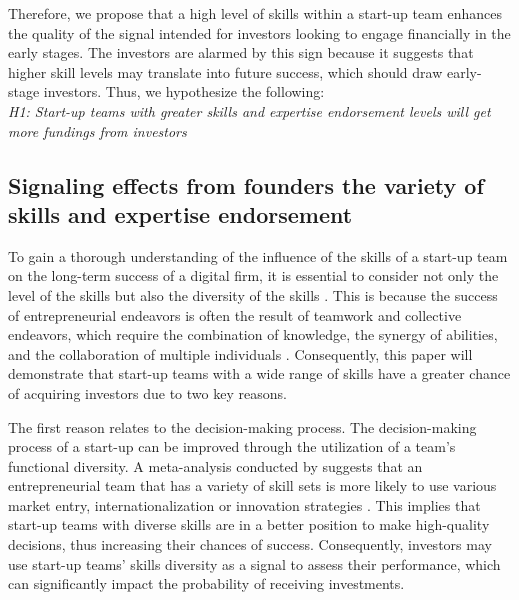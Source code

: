 \documentclass[12pt]{article}
\begin{document}
Therefore, we propose that a high level of skills within a start-up team enhances the quality of the signal intended for investors looking to engage financially in the early stages. The investors are alarmed by this sign because it suggests that higher skill levels may translate into future success, which should draw early-stage investors. Thus, we hypothesize the following: \\

\noindent \textit{H1: Start-up teams with greater skills and expertise endorsement levels will get more fundings from investors} \\

\subsection{Signaling effects from founders the variety of skills and expertise endorsement}

To gain a thorough understanding of the influence of the skills of a start-up team on the long-term success of a digital firm, it is essential to consider not only the level of the skills but also the diversity of the skills \citep{harrison2007s, grillitsch2021does}. This is because the success of entrepreneurial endeavors is often the result of teamwork and collective endeavors, which require the combination of knowledge, the synergy of abilities, and the collaboration of multiple individuals \citep{klotz2014new}. Consequently, this paper will demonstrate that start-up teams with a wide range of skills have a greater chance of acquiring investors due to two key reasons.

The first reason relates to the decision-making process. The decision-making process of a start-up can be improved through the utilization of a team's functional diversity. A meta-analysis conducted by \citet{jin2017entrepreneurial} suggests that an entrepreneurial team that has a variety of skill sets is more likely to use various market entry, internationalization or innovation strategies \citep{boeker1989strategic}. This implies that start-up teams with diverse skills are in a better position to make high-quality decisions, thus increasing their chances of success. Consequently, investors may use start-up teams' skills diversity as a signal to assess their performance, which can significantly impact the probability of receiving investments.
\end{document}
